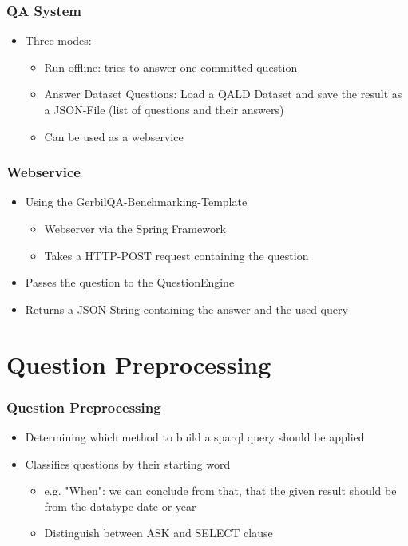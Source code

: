 \documentclass{beamer}
\begin{document}
\begin{frame}
\frametitle{QA System}
\begin{itemize}
	\item Three modes:
	\begin{itemize}		
		\item Run offline: tries to answer one committed question
		\item Answer Dataset Questions: Load a QALD Dataset and save the result as a JSON-File (list of questions and their answers)
		\item Can be used as a webservice
	\end{itemize}
\end{itemize}
\end{frame}

\begin{frame}
	\frametitle{Webservice}
	\begin{itemize}
		\item Using the GerbilQA-Benchmarking-Template
		\begin{itemize}
			\item Webserver via the Spring Framework
			\item Takes a HTTP-POST request containing the question
		\end{itemize}
		\item Passes the question to the QuestionEngine
		\item Returns a JSON-String containing the answer and the used query
	\end{itemize}
\end{frame}

\section{Question Preprocessing}

\begin{frame}
\frametitle{Question Preprocessing}
\begin{itemize}
	\item Determining which method to build a sparql query should be applied
	\item Classifies questions by their starting word
	\begin{itemize}
		\item e.g. "When": we can conclude from that, that the given result should be from the datatype date or year
		\item Distinguish between ASK and SELECT clause
	\end{itemize}
\end{itemize}
\end{frame}
\end{document}
